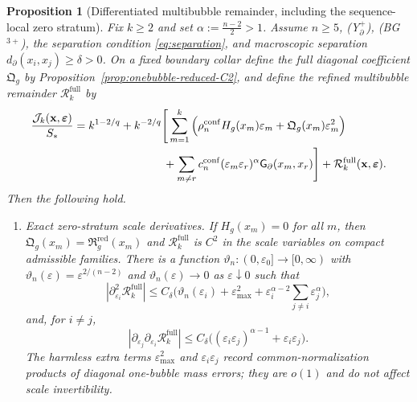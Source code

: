 \documentclass[11pt,reqno,a4paper]{amsart}
\numberwithin{equation}{section}
\theoremstyle{plain}
\newtheorem{proposition}[theorem]{Proposition}
\theoremstyle{remark}
\theoremstyle{plain}
\begin{document}
\begin{proposition}[Differentiated multibubble remainder, including the sequence-local zero stratum]
\label{hyp:diff-multibubble}
Fix $k\ge2$ and set $\alpha:=\frac{n-2}{2}>1$.  Assume $n\ge5$,
\textup{(Y$^+_{\partial}$)}, \textup{(BG$^{3+}$)}, the separation condition
\eqref{eq:separation}, and macroscopic separation
$d_\partial(x_i,x_j)\ge\delta>0$.
On a fixed boundary collar define the full diagonal coefficient $\mathfrak Q_g$ by
Proposition~\ref{prop:onebubble-reduced-C2}, and define the refined multibubble remainder
$\mathcal R_k^{\mathrm{full}}$ by
\begin{equation}\label{eq:Rk-full-Q-definition}
\begin{aligned}
\frac{\mathcal J_k(\mathbf x,\boldsymbol\varepsilon)}{S_\ast}
&=k^{1-2/q}
+k^{-2/q}\Bigg[
\sum_{m=1}^k\Big(\rho_n^{\mathrm{conf}}H_g(x_m)\varepsilon_m
+\mathfrak Q_g(x_m)\varepsilon_m^2\Big) \\
&\hspace{28mm}
+\sum_{m\ne r}c_n^{\mathrm{conf}}(\varepsilon_m\varepsilon_r)^\alpha
\mathsf G_\partial(x_m,x_r)
\Bigg]
+\mathcal R_k^{\mathrm{full}}(\mathbf x,\boldsymbol\varepsilon).
\end{aligned}
\end{equation}
Then the following hold.

\begin{enumerate}[label=\textup{(\alph*)},leftmargin=1.5em]
\item \emph{Exact zero-stratum scale derivatives.}
If $H_g(x_m)=0$ for all $m$, then $\mathfrak Q_g(x_m)=\mathfrak R_g^{\mathrm{red}}(x_m)$ and
$\mathcal R_k^{\mathrm{full}}$ is $C^2$ in the scale variables on compact admissible families.  There is a function
$\vartheta_n:(0,\varepsilon_0]\to[0,\infty)$ with
$\vartheta_n(\varepsilon)=\varepsilon^{2/(n-2)}$ and
$\vartheta_n(\varepsilon)\to0$ as $\varepsilon\downarrow0$ such that
\begin{equation}\label{eq:C2-eps-Rk-new}
|\partial_{\varepsilon_i}^2\mathcal R_k^{\mathrm{full}}|
\le C_\delta\Big(\vartheta_n(\varepsilon_i)+\varepsilon_{\max}^2
+\varepsilon_i^{\alpha-2}\sum_{j\ne i}\varepsilon_j^\alpha\Big),
\end{equation}
and, for $i\ne j$,
\begin{equation}\label{eq:C2-eps-Rk-cross-new}
|\partial_{\varepsilon_j}\partial_{\varepsilon_i}\mathcal R_k^{\mathrm{full}}|
\le C_\delta\Big((\varepsilon_i\varepsilon_j)^{\alpha-1}+\varepsilon_i\varepsilon_j\Big).
\end{equation}
The harmless extra terms $\varepsilon_{\max}^2$ and $\varepsilon_i\varepsilon_j$ record common-normalization
products of diagonal one-bubble mass errors; they are $o(1)$ and do not affect scale invertibility.



\end{enumerate}
\end{proposition}
\end{document}
